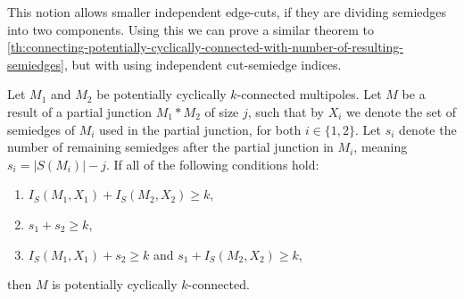 \documentclass[12pt, twoside]{book}
\begin{document}
This notion allows smaller independent edge-cuts, if they are dividing semiedges into two components. Using this we can prove a similar theorem to \cref{th:connecting-potentially-cyclically-connected-with-number-of-resulting-semiedges}, but with using independent cut-semiedge indices.

\begin{theorem}\label{th:potentially-cyclically-connected-independent-semiedge-index}
	Let $M_1$ and $M_2$ be potentially cyclically $k$-connected multipoles. Let $M$ be a result of a partial junction $M_1*M_2$ of size $j$, such that by $X_i$ we denote the set of semiedges of $M_i$ used in the partial junction, for both $i\in \{1,2\}$. Let $s_i$ denote the number of remaining semiedges after the partial junction in $M_i$, meaning ${s_i=|S(M_i)|-j}$. If all of the following conditions hold:
	\begin{enumerate}[label=(\roman*)]
		\item $I_S(M_1, X_1)+I_S(M_2, X_2)\geq k$,
		\item $s_1+s_2\geq k$,
		\item $I_S(M_1, X_1)+s_2\geq k$ and $s_1+I_S(M_2, X_2)\geq k$,
	\end{enumerate}
	then $M$ is potentially cyclically $k$-connected.
\end{theorem}
\end{document}
